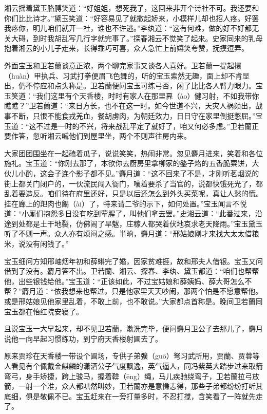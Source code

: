 \documentclass[12pt,oneside]{book}
\begin{document}
湘云摇着黛玉胳膊笑道：“好姐姐，想死我了，这回来非开个诗社不可。我还要和你们比比诗才。”黛玉笑道：“好容易见了就撒起娇来，小模样儿却也招人疼。好罢我疼你，明儿咱们就开一社，谁也不许逃。”李纨道：“这有何难，做的好不好都无关大碍，到时我胡乱写几行字就完事了。”探春湘云不觉笑了起来。史家同来的乳母抱着湘云的小儿子走来，长得乖巧可喜，众人急忙上前嬉笑夸赞，抚摸逗弄。

外面宝玉和卫若蘭谈意正浓，两个聊完家事又谈各人喜好。卫若蘭一提起擐（huàn）甲执兵、习武打拳便眉飞色舞的，听的宝玉索然无趣，面上却不肯显出，仍不停应和点头称是。卫若蘭便问宝玉可练弓否，闲了比比各人臂力眼力。宝玉笑道：“我们这里有个天香楼，时时有家人在那里奡（ào）健习射，不如我带你瞧瞧？”卫若蘭道：“来日方长，也不在这一时。如今世道不兴，天灾人祸频出，战事不断，只恨不能食戎羌血，餐胡虏肉，为朝廷效力，日日守在家里倒挺憋屈。”宝玉道：“这不过是一时的不兴，将来战乱平定了就好了，咱又何必多虑。”卫若蘭正要作答，忽听湘云喊他们到屋里坐，两个不则声往房内来。

大家团团围坐在一起磕着瓜子，说说笑笑，热闹非常。忽见麝月进来，笑着和各位施礼。宝玉道：“你刚去那了，本欲你去厨房里拿柳家的鏊子烙的五香脆粟饼，大伙儿小酌，这会子连个影子都不见。”麝月道：“这不回来了不是，才刚听茗烟说的街上都关门闭户的，一伙流民闯入衙门，嚷着要杀了当官的，说都快饿死光了，都乱着要造反。咱们待在府里还好，只是以后还怎么到外头买菜呢，真让人愁的慌。挂在廊上的羓肉也餲（ài）了，特来请二爷的示下，如何处置。”宝玉闻言不悦道：“小厮们抱怨多日没有吃到荤腥了，叫他们拿去罢。”史湘云道：“此番过来，沿途到处都是土干地裂，仿佛闹了旱魃，庄稼人都哭着伏地哀求老天降雨。”宝玉黛玉听了不则一声。众人亦有烦闷之感。半晌，麝月道：“邢姑娘刚才来找大太太借粮米，说没有闲钱了。”

宝玉细问方知邢岫烟年初和薛蝌完了婚，因家贫难捱，故和邢夫人借银。宝玉又问借到了没有。麝月答不出。卫若蘭、湘云、探春、李纨、黛玉都道：“咱们也帮帮他，出些银钱给他。”宝玉道：“正该如此，不过宝姑娘和薛姨妈、薛大哥怎么不帮？”麝月道：“依我想来也帮过，只是他家里天天吵闹，那两个怕是不愿意帮他。或是邢姑娘见他家里乱着，不敢上前，也不敢说。”大家都点首称是。晚间卫若蘭同宝玉都在怡红院安寝了。

且说宝玉一大早起来，却不见卫若蘭，漱洗完毕，便问麝月卫公子去那儿了，麝月说他一向早起习惯练功，到宁府天香楼射圃去了。

原来贾珍在天香楼一带设个圃场，专供子弟彍（guō）弩习武所用，贾蘭、贾蓉等人看见有个佩戴金麒麟的潇洒公子气度飘逸，英气逼人，同冯紫英大踏步过来取箭弯弓，身手矫捷，跨上骏马，握着鞥（ēng）绳，马儿疾驰绕弯子，卫若蘭拉弓放箭，一射一个准，众人都哄然叫妙，卫若蘭亦是意慊志得，那些子弟都纷纷打听其底细，俱是敬佩不已。宝玉赶来在一旁打量多时，不忍打搅，含笑看了一阵就先走了。
\end{document}
